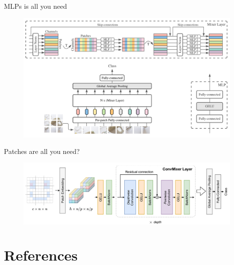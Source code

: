 \documentclass[xcolor=pdftex,dvipsnames,table,mathserif]{beamer}
\begin{document}
\begin{frame}{MLPs is all you need~\cite{tolstikhin_mlp-mixer_2021}}

  \begin{figure}[ht]
    \centering
    \includegraphics[width=\textwidth]{mixer}
  \end{figure}

\end{frame}


\begin{frame}{Patches are all you need?~\cite{trockman_patches_2022}}

\begin{figure}[ht]
  \centering
  \includegraphics[width=\textwidth]{conv_mixer}
\end{figure}


\end{frame}



\section*{References}


\end{document}
